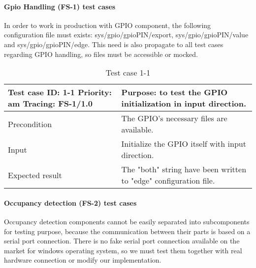 \paragraph{Gpio Handling (FS-1) test cases} In order to work in production with GPIO component, the following configuration file must exists: sys/gpio/gpioPIN/export, sys/gpio/gpioPIN/value and sys/gpio/gpioPIN/edge. This need is also propagate to all test cases regarding GPIO handling, so files must be accessible or mocked. 
\begin{table}[H]
	\caption{Test case 1-1}
	\label{table:TCase-FS1-01}
	\begin{center}
		\renewcommand{\arraystretch}{1.8}
		\begin{tabu} 
			to 0.9 \textwidth
			{  X[0.4, c] X[c] }
			\toprule
			Test case ID: 1-1 \newline Priority: am \newline Tracing: FS-1/1.0 & Purpose: to test the GPIO initialization in input direction.       \\ \midrule
			Precondition                                                       & The GPIO's necessary files are available.                          \\
			Input                                                              & Initialize the GPIO itself with input direction.                  \\
			Expected result                                                    & The "both" string have been written to "edge" configuration file. \\ \bottomrule
		\end{tabu}
	\end{center}
\end{table}

\paragraph{Occupancy detection (FS-2) test cases} Occupancy detection components cannot be easily separated into subcomponents for testing purpose, because the communication between their parts is based on a serial port connection. There is no fake serial port connection  available on the market for windows operating system, so we must test them together with real hardware connection or modify our implementation.

